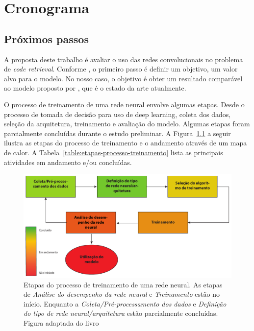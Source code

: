 \chapter{Cronograma}
\label{cap:cronograma}

\section{Próximos passos}

A proposta deste trabalho é avaliar o uso das redes convolucionais no problema de \textit{code retrieval}. Conforme \cite{Goodfellow-et-al-2016:pratical-methodology}, o primeiro passo é definir um objetivo, um valor alvo para o modelo. No nosso caso, o objetivo é obter um resultado comparável ao modelo proposto por \cite{cambronero-deep-learning-code-search:2019}, que é o estado da arte atualmente.

O processo de treinamento de uma rede neural envolve algumas etapas. Desde o processo de tomada de decisão para uso de deep learning, coleta dos dados, seleção da arquitetura, treinamento e avaliação do modelo. Algumas etapas foram parcialmente concluídas durante o estudo preliminar. A Figura~\ref{fig:neural-network-process-training} a seguir ilustra as etapas do processo de treinamento e o andamento através de um mapa de calor. A Tabela~\ref{table:etapas-processo-treinamento} lista as principais atividades em andamento e/ou concluídas.


\begin{figure}[h]
    \centering
    \includegraphics[width=1\textwidth]{figuras/cap-cronograma/training_process.pdf}
    \caption{Etapas do processo de treinamento de uma rede neural. As etapas de \emph{Análise do desempenho da rede neural} e \emph{Treinamento} estão no início. Enquanto a \emph{Coleta/Pré-processamento dos dados} e \emph{Definição do tipo de rede neural/arquitetura} estão parcialmente concluídas. Figura adaptada do livro \cite{nndesign:2014:pratical-training-issues}}
    \label{fig:neural-network-process-training}
\end{figure}

